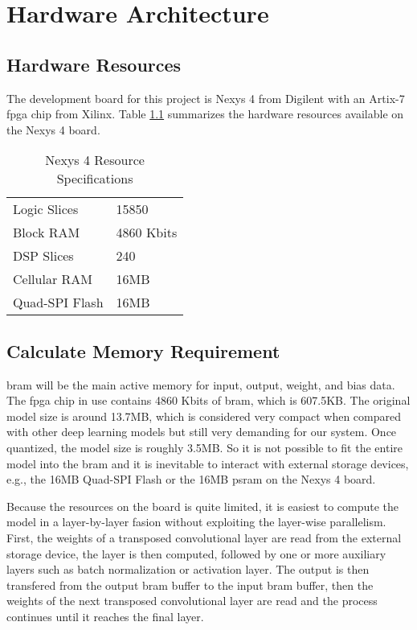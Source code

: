 
\chapter{Hardware Architecture}

\section{Hardware Resources}

The development board for this project is Nexys 4 from Digilent with an Artix-7 \gls{fpga} chip from Xilinx.
Table \ref{table:hardware_resources} summarizes the hardware resources available on the Nexys 4 board.

\begin{table}[h]
  \centering
  \caption{Nexys 4 Resource Specifications}
  \begin{tabular}{l | l}
    Logic Slices & 15850 \\
    Block RAM & 4860 Kbits \\
    DSP Slices & 240 \\
    Cellular RAM & 16MB \\
    Quad-SPI Flash & 16MB
  \end{tabular}
  \label{table:hardware_resources}
\end{table}

\section{Calculate Memory Requirement}

\gls{bram} will be the main active memory for input, output, weight, and bias data. The \gls{fpga} chip in use
contains 4860 Kbits of \gls{bram}, which is 607.5KB. The original model size is around 13.7MB, which is
considered very compact when compared with other deep learning models but still very demanding for
our system. Once quantized, the model size is roughly 3.5MB. So it is not possible to fit the entire model
into the \gls{bram} and it is inevitable to interact with external storage devices, e.g., the 16MB Quad-SPI
Flash or the 16MB \gls{psram} on the Nexys 4 board.

Because the resources on the board is quite limited, it is easiest to compute the model in a layer-by-layer
fasion without exploiting the layer-wise parallelism. First, the weights of a transposed
convolutional layer are read from the external storage device, the layer is then computed, followed by one or
more auxiliary layers such as batch normalization or activation layer. The output is then transfered from
the output \gls{bram} buffer to the input \gls{bram} buffer, then the weights of the next transposed
convolutional layer are read and the process continues until it reaches the final layer.

